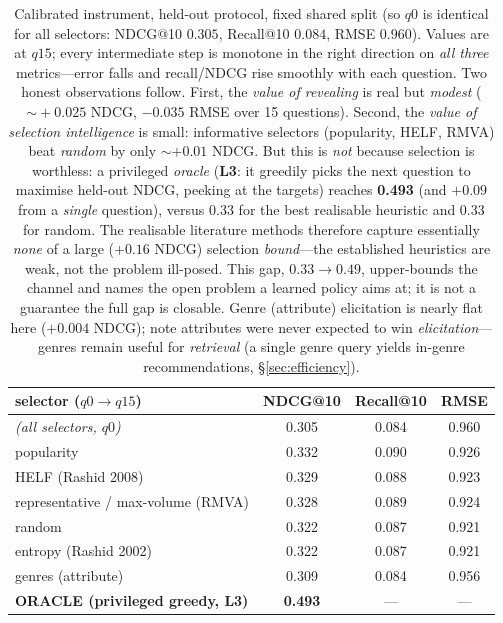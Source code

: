 \documentclass[11pt]{article}
\begin{document}
\begin{table}[h]\centering\small
\begin{tabular}{lccc}
\toprule
selector ($q0\!\to\!q15$) & NDCG@10 & Recall@10 & RMSE\\
\midrule
\emph{(all selectors, $q0$)} & 0.305 & 0.084 & 0.960\\
\midrule
popularity & 0.332 & 0.090 & 0.926\\
HELF (Rashid 2008) & 0.329 & 0.088 & 0.923\\
representative / max-volume (RMVA) & 0.328 & 0.089 & 0.924\\
random & 0.322 & 0.087 & 0.921\\
entropy (Rashid 2002) & 0.322 & 0.087 & 0.921\\
genres (attribute) & 0.309 & 0.084 & 0.956\\
\midrule
\textbf{ORACLE (privileged greedy, L3)} & \textbf{0.493} & --- & ---\\
\bottomrule
\end{tabular}
\caption{Calibrated instrument, held-out protocol, fixed shared split (so $q0$ is identical for all selectors:
NDCG@10 $0.305$, Recall@10 $0.084$, RMSE $0.960$). Values are at $q15$; every intermediate step is monotone in the
right direction on \emph{all three} metrics---error falls and recall/NDCG rise smoothly with each question. Two
honest observations follow. First, the \emph{value of revealing} is real but \emph{modest} ($\sim\!+0.025$ NDCG,
$-0.035$ RMSE over 15 questions). Second, the \emph{value of selection intelligence} is small: informative selectors
(popularity, HELF, RMVA) beat \emph{random} by only ${\sim}{+}0.01$ NDCG. But this is \emph{not} because selection is
worthless: a privileged \emph{oracle} (\textbf{L3}: it greedily picks the next question to maximise held-out NDCG,
peeking at the targets) reaches
\textbf{0.493} (and $+0.09$ from a \emph{single} question), versus $0.33$ for the best realisable heuristic and $0.33$
for random. The realisable literature methods therefore capture essentially \emph{none} of a large ($+0.16$ NDCG)
selection \emph{bound}---the established heuristics are weak, not the problem ill-posed. This gap, $0.33\!\to\!0.49$,
upper-bounds the channel and names the open problem a learned policy aims at; it is not a guarantee the full gap is
closable. Genre (attribute) elicitation is nearly flat here ($+0.004$ NDCG); note
attributes were never expected to win \emph{elicitation}---genres remain useful for \emph{retrieval} (a single genre
query yields in-genre recommendations, \S\ref{sec:efficiency}).}
\label{tab:s4panel}
\end{table}
\end{document}
